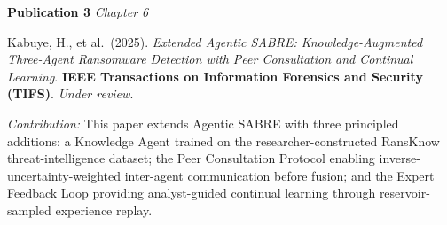 \vspace{1.5em}

\noindent\textbf{Publication 3} \hfill \textit{Chapter 6}

\vspace{0.5em}
\noindent Kabuye, H., et al.\ (2025).
\textit{Extended Agentic SABRE: Knowledge-Augmented Three-Agent Ransomware Detection
with Peer Consultation and Continual Learning}.
\textbf{IEEE Transactions on Information Forensics and Security (TIFS)}.
\textit{Under review}.

\vspace{0.5em}
\noindent\textit{Contribution:} This paper extends Agentic SABRE with three principled
additions: a Knowledge Agent trained on the researcher-constructed RansKnow
threat-intelligence dataset; the Peer Consultation Protocol enabling inverse-uncertainty-weighted
inter-agent communication before fusion; and the Expert Feedback Loop providing
analyst-guided continual learning through reservoir-sampled experience replay.
